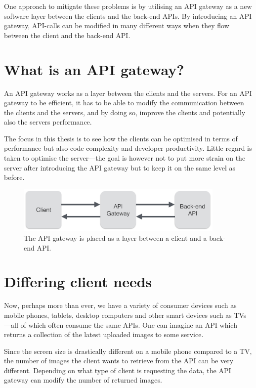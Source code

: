\documentclass{cslthse-msc}
\begin{document}
One approach to mitigate these problems is by utilising an API gateway as a new software layer between the clients and the back-end APIs. By introducing an API gateway, API-calls can be modified in many different ways when they flow between the client and the back-end API.

\section{What is an API gateway?}
An API gateway works as a layer between the clients and the servers. For an API gateway to be efficient, it has to be able to modify the communication between the clients and the servers, and by doing so, improve the clients and potentially also the servers performance.

The focus in this thesis is to see how the clients can be optimised in terms of performance but also code complexity and developer productivity. Little regard is taken to optimise the server---the goal is however not to put more strain on the server after introducing the API gateway but to keep it on the same level as before.

\begin{figure}[H]
  \centering
    \begin{center}
      \includegraphics[width=0.9\textwidth]{images/api_gateway.png}
    \end{center}
  \caption{The API gateway is placed as a layer between a client and a back-end API.}
\end{figure}

\section{Differing client needs}
Now, perhaps more than ever, we have a variety of consumer devices such as mobile phones, tablets, desktop computers and other smart devices such as TVs---all of which often consume the same APIs. One can imagine an API which returns a collection of the latest uploaded images to some service. 

Since the screen size is drastically different on a mobile phone compared to a TV, the number of images the client wants to retrieve from the API can be very different. Depending on what type of client is requesting the data, the API gateway can modify the number of returned images.
\end{document}
